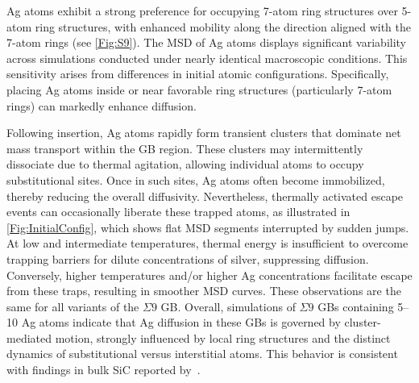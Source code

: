 \documentclass[%
preprint,
amsmath,amssymb,
aps,
]{revtex4-2}
\newcommand{\?}{\stackrel{?}{=}}
\begin{document}
Ag atoms exhibit a strong preference for occupying 7-atom ring structures over 5-atom ring structures, with enhanced mobility along the direction aligned with the 7-atom rings (see \cref{Fig:S9}). The MSD of Ag atoms displays significant variability across simulations conducted under nearly identical macroscopic conditions. This sensitivity arises from differences in initial atomic configurations. Specifically, placing Ag atoms inside or near favorable ring structures (particularly 7-atom rings) can markedly enhance diffusion.

Following insertion, Ag atoms rapidly form transient clusters that dominate net mass transport within the GB region. These clusters may intermittently dissociate due to thermal agitation, allowing individual atoms to occupy substitutional sites. Once in such sites, Ag atoms often become immobilized, thereby reducing the overall diffusivity. Nevertheless, thermally activated escape events can occasionally liberate these trapped atoms, as illustrated in \cref{Fig:InitialConfig}, which shows flat MSD segments interrupted by sudden jumps. At low and intermediate temperatures, thermal energy is insufficient to overcome trapping barriers for dilute concentrations of silver, suppressing diffusion. Conversely, higher temperatures and/or higher Ag concentrations facilitate escape from these traps, resulting in smoother MSD curves. These observations are the same for all variants of the $\Sigma 9$ GB. Overall, simulations of $\Sigma 9$ GBs containing 5--10 Ag atoms indicate that Ag diffusion in these GBs is governed by cluster-mediated motion, strongly influenced by local ring structures and the distinct dynamics of substitutional versus interstitial atoms. This behavior is consistent with findings in bulk SiC reported by~\cite{Chen2019, Jiang2021}.
\end{document}
